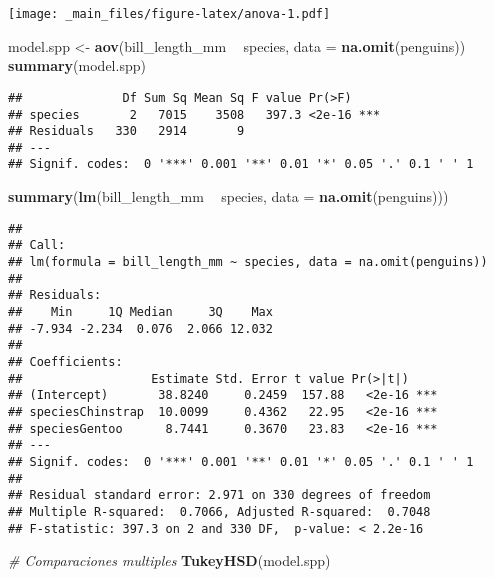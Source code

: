 \documentclass[
]{book}
\newenvironment{Shaded}{\begin{snugshade}}{\end{snugshade}}
\newcommand{\CommentTok}[1]{\textcolor[rgb]{0.56,0.35,0.01}{\textit{#1}}}
\newcommand{\DataTypeTok}[1]{\textcolor[rgb]{0.13,0.29,0.53}{#1}}
\newcommand{\KeywordTok}[1]{\textcolor[rgb]{0.13,0.29,0.53}{\textbf{#1}}}
\newcommand{\NormalTok}[1]{#1}
\newcommand{\OperatorTok}[1]{\textcolor[rgb]{0.81,0.36,0.00}{\textbf{#1}}}
\newcommand{\StringTok}[1]{\textcolor[rgb]{0.31,0.60,0.02}{#1}}
\begin{document}
\texttt{[image: \_main\_files/figure-latex/anova-1.pdf]}

\begin{Shaded}
\begin{Highlighting}[]
\NormalTok{model.spp <-}\StringTok{ }\KeywordTok{aov}\NormalTok{(bill_length_mm }\OperatorTok{~}\StringTok{ }\NormalTok{species, }\DataTypeTok{data =} \KeywordTok{na.omit}\NormalTok{(penguins))}
\KeywordTok{summary}\NormalTok{(model.spp)}
\end{Highlighting}
\end{Shaded}

\begin{verbatim}
##              Df Sum Sq Mean Sq F value Pr(>F)    
## species       2   7015    3508   397.3 <2e-16 ***
## Residuals   330   2914       9                   
## ---
## Signif. codes:  0 '***' 0.001 '**' 0.01 '*' 0.05 '.' 0.1 ' ' 1
\end{verbatim}

\begin{Shaded}
\begin{Highlighting}[]
\KeywordTok{summary}\NormalTok{(}\KeywordTok{lm}\NormalTok{(bill_length_mm }\OperatorTok{~}\StringTok{ }\NormalTok{species, }\DataTypeTok{data =} \KeywordTok{na.omit}\NormalTok{(penguins)))}
\end{Highlighting}
\end{Shaded}

\begin{verbatim}
## 
## Call:
## lm(formula = bill_length_mm ~ species, data = na.omit(penguins))
## 
## Residuals:
##    Min     1Q Median     3Q    Max 
## -7.934 -2.234  0.076  2.066 12.032 
## 
## Coefficients:
##                  Estimate Std. Error t value Pr(>|t|)    
## (Intercept)       38.8240     0.2459  157.88   <2e-16 ***
## speciesChinstrap  10.0099     0.4362   22.95   <2e-16 ***
## speciesGentoo      8.7441     0.3670   23.83   <2e-16 ***
## ---
## Signif. codes:  0 '***' 0.001 '**' 0.01 '*' 0.05 '.' 0.1 ' ' 1
## 
## Residual standard error: 2.971 on 330 degrees of freedom
## Multiple R-squared:  0.7066, Adjusted R-squared:  0.7048 
## F-statistic: 397.3 on 2 and 330 DF,  p-value: < 2.2e-16
\end{verbatim}

\begin{Shaded}
\begin{Highlighting}[]
\CommentTok{# Comparaciones multiples}
\KeywordTok{TukeyHSD}\NormalTok{(model.spp)}
\end{Highlighting}
\end{Shaded}
\end{document}
